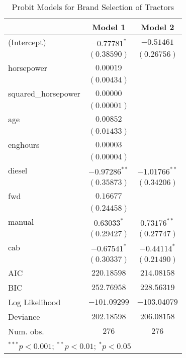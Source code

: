 
\begin{table}
\begin{center}
\begin{tabular}{l c c}
\hline
 & Model 1 & Model 2 \\
\hline
(Intercept)         & $-0.77781^{*}$  & $-0.51461$      \\
                    & $(0.38590)$     & $(0.26756)$     \\
horsepower          & $0.00019$       &                 \\
                    & $(0.00434)$     &                 \\
squared\_horsepower & $0.00000$       &                 \\
                    & $(0.00001)$     &                 \\
age                 & $0.00852$       &                 \\
                    & $(0.01433)$     &                 \\
enghours            & $0.00003$       &                 \\
                    & $(0.00004)$     &                 \\
diesel              & $-0.97286^{**}$ & $-1.01766^{**}$ \\
                    & $(0.35873)$     & $(0.34206)$     \\
fwd                 & $0.16677$       &                 \\
                    & $(0.24458)$     &                 \\
manual              & $0.63033^{*}$   & $0.73176^{**}$  \\
                    & $(0.29427)$     & $(0.27747)$     \\
cab                 & $-0.67541^{*}$  & $-0.44114^{*}$  \\
                    & $(0.30337)$     & $(0.21490)$     \\
\hline
AIC                 & $220.18598$     & $214.08158$     \\
BIC                 & $252.76958$     & $228.56319$     \\
Log Likelihood      & $-101.09299$    & $-103.04079$    \\
Deviance            & $202.18598$     & $206.08158$     \\
Num. obs.           & $276$           & $276$           \\
\hline
\multicolumn{3}{l}{\scriptsize{$^{***}p<0.001$; $^{**}p<0.01$; $^{*}p<0.05$}}
\end{tabular}
\caption{Probit Models for Brand Selection of Tractors}
\label{tab:reg_probit}
\end{center}
\end{table}

